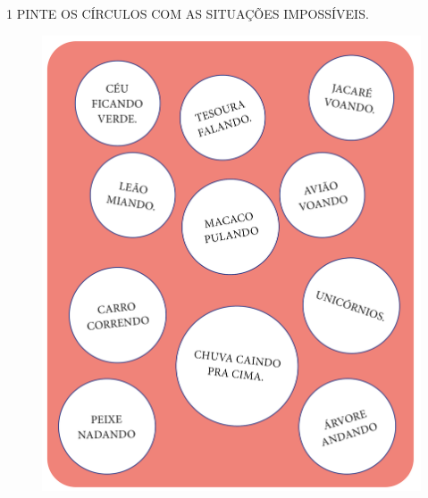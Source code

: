 \num{1} PINTE OS CÍRCULOS COM AS SITUAÇÕES IMPOSSÍVEIS.


\begin{figure}[H]
\centering
\includegraphics[width=\textwidth]{./media/SAEB_1ANO_MAT_FIGURA84.png}
\end{figure}




